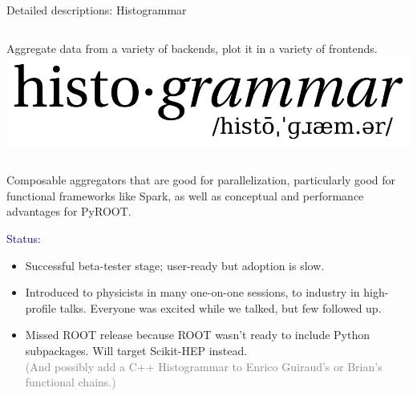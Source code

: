 \documentclass{beamer}
\begin{document}
\begin{frame}{Detailed descriptions: Histogrammar}
\vspace{0.6 cm}
\begin{columns}
Aggregate data from a variety of backends, plot it in a variety of frontends.
\includegraphics[width=\linewidth]{histogrammar-logo.png}
\end{columns}

\vspace{0.4 cm}
Composable aggregators that are good for parallelization, particularly good for functional frameworks like Spark, as well as conceptual and performance advantages for PyROOT.

\vspace{0.4 cm}
\textcolor{darkblue}{Status:}
\begin{itemize}
\item Successful beta-tester stage; user-ready but adoption is slow.
\item Introduced to physicists in many one-on-one sessions, to industry in high-profile talks. Everyone was excited while we talked, but few followed up.
\item Missed ROOT release because ROOT wasn't ready to include Python subpackages. Will target Scikit-HEP instead. \\ \textcolor{gray}{(And possibly add a C++ Histogrammar to Enrico Guiraud's or Brian's functional chains.)}
\end{itemize}
\end{frame}
\end{document}
